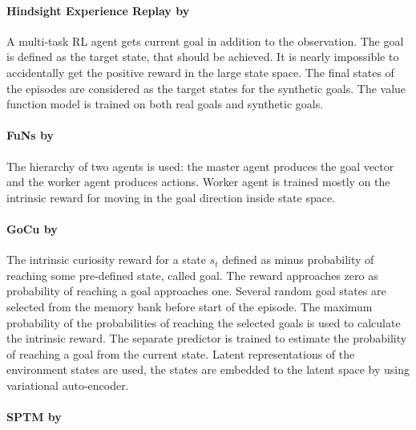 \documentclass[acmsmall, nonacm]{acmart}
\begin{document}

\paragraph{Hindsight Experience Replay by~\citet{andrychowicz_hindsight_2017}} %
\label{par:hindsight}

A multi-task RL agent gets current goal in addition to the observation. The goal is defined as the target state, that should be achieved. It is nearly impossible to accidentally get the positive reward in the large state space. The final states of the episodes are considered as the target states for the synthetic goals. The value function model is trained on both real goals and synthetic goals.


\paragraph{FuNs by~\citet{Vezhnevets2017FeUdalNF}} %
\label{par:funs}

The hierarchy of two agents is used: the master agent produces the goal vector and the worker agent produces actions. Worker agent is trained mostly on the intrinsic reward for moving in the goal direction inside state space.


\paragraph{GoCu by~\citet{Bougie2019SkillbasedCF}} %
\label{par:gocu}

The intrinsic curiosity reward for a state $s_t$ defined as minus probability of reaching some pre-defined state, called goal. The reward approaches zero as probability of reaching a goal approaches one. Several random goal states are selected from the memory bank before start of the episode. The maximum probability of the probabilities of reaching the selected goals is used to calculate the intrinsic reward. The separate predictor is trained to estimate the probability of reaching a goal from the current state. Latent representations of the environment states are used, the states are embedded to the latent space by using variational auto-encoder.


\paragraph{SPTM by~\citet{savinov2018semiparametric}} %
\label{par:sptm}
\end{document}
